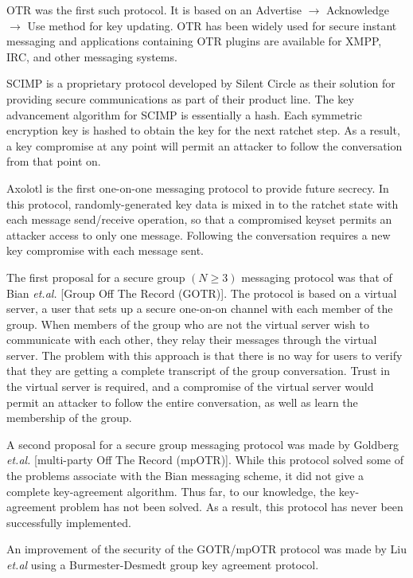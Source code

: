 \documentclass[%
preprint,
amsmath,amssymb,
aps,
prb,
floatfix,
]{revtex4-1}
\begin{document}
OTR was the first such protocol. It is based on an Advertise $\rightarrow$
Acknowledge $\rightarrow$ Use method for key updating. OTR has been widely used
for secure instant messaging and applications containing OTR plugins are
available for XMPP, IRC, and other messaging systems.

SCIMP is a proprietary protocol developed by Silent Circle as their solution for
providing secure communications as part of their product line. The key
advancement algorithm for SCIMP is essentially a hash. Each symmetric encryption
key is hashed to obtain the key for the next ratchet step. As a result, a key
compromise at any point will permit an attacker to follow the conversation from
that point on.

Axolotl is the first one-on-one messaging protocol to provide future secrecy. In
this protocol, randomly-generated key data is mixed in to the ratchet state with
each message send/receive operation, so that a compromised keyset permits an
attacker access to only one message. Following the conversation requires a new
key compromise with each message sent.

The first proposal for a secure group $(N \ge 3)$ messaging protocol was that of
Bian \textit{et.al.}\cite{ref:bian} [Group Off The Record (GOTR)]. The protocol is based on a virtual server,
a user that sets up a secure one-on-on channel with each member of the group.
When members of the group who are not the virtual server wish to communicate
with each other, they relay their messages through the virtual server. The
problem with this approach is that there is no way for users to verify that they
are getting a complete transcript of the group conversation. Trust in the
virtual server is required, and a compromise of the virtual server would permit
an attacker to follow the entire conversation, as well as learn the membership
of the group.

A second proposal for a secure group messaging protocol was made by Goldberg
\textit{et.al.}\cite{ref:goldberg} [multi-party Off The Record (mpOTR)].
While this protocol solved some of the
problems associate with the Bian messaging scheme, it did not give a complete
key-agreement algorithm. Thus far, to our knowledge, the key-agreement problem
has not been solved. As a result, this protocol has never been successfully
implemented.

An improvement of the security of the GOTR/mpOTR protocol was made by Liu
\textit{et.al}\cite{ref:liu} using a Burmester-Desmedt group key agreement
protocol.
\end{document}
